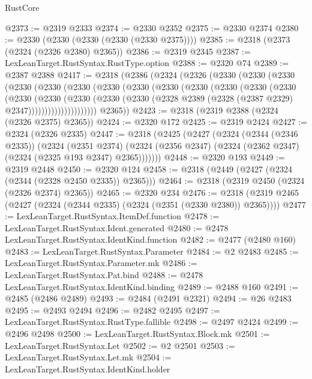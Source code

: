 \begin{lexlean}{RustCore}
\begin{coremodule}
@2373 := @2319 @2333
@2374 := @2330 @2352
@2375 := @2330 @2374
@2380 := @2330 (@2330 (@2330 (@2330 (@2330 @2375))))
@2385 := @2318 (@2373 (@2324 (@2326 @2380) @2365))
@2386 := @2319 @2345
@2387 := LexLeanTarget.RustSyntax.RustType.option
@2388 := @2320 @74
@2389 := @2387 @2388
@2417 := @2318
    (@2386
      (@2324
        (@2326
          (@2330
            (@2330
              (@2330
                (@2330
                  (@2330
                    (@2330
                      (@2330
                        (@2330
                          (@2330
                            (@2330
                              (@2330
                                (@2330
                                  (@2330
                                    (@2330
                                      (@2330
                                        (@2330
                                          (@2330
                                            (@2330
                                              (@2328
                                                @2389
                                                (@2328 (@2387 @2329) @2347)))))))))))))))))))))
        @2365))
@2423 := @2318 (@2319 @2388 (@2324 (@2326 @2375) @2365))
@2424 := @2320 @172
@2425 := @2319 @2424
@2427 := @2324 (@2326 @2335)
@2447 := @2318
    (@2425
      (@2427
        (@2324
          (@2344 (@2346 @2335))
          (@2324
            (@2351 @2374)
            (@2324 (@2356 @2347) (@2324 (@2362 @2347) (@2324 (@2325 @193 @2347) @2365)))))))
@2448 := @2320 @193
@2449 := @2319 @2448
@2450 := @2320 @124
@2458 := @2318 (@2449 (@2427 (@2324 (@2344 (@2328 @2450 @2335)) @2365)))
@2464 := @2318 (@2319 @2450 (@2324 (@2326 @2374) @2365))
@2465 := @2320 @234
@2476 := @2318 (@2319 @2465 (@2427 (@2324 (@2344 @2335) (@2324 (@2351 (@2330 @2380)) @2365))))
@2477 := LexLeanTarget.RustSyntax.ItemDef.function
@2478 := LexLeanTarget.RustSyntax.Ident.generated
@2480 := @2478 LexLeanTarget.RustSyntax.IdentKind.function
@2482 := @2477 (@2480 @160)
@2483 := LexLeanTarget.RustSyntax.Parameter
@2484 := @2 @2483
@2485 := LexLeanTarget.RustSyntax.Parameter.mk
@2486 := LexLeanTarget.RustSyntax.Pat.bind
@2488 := @2478 LexLeanTarget.RustSyntax.IdentKind.binding
@2489 := @2488 @160
@2491 := @2485 (@2486 @2489)
@2493 := @2484 (@2491 @2321)
@2494 := @26 @2483
@2495 := @2493 @2494
@2496 := @2482 @2495
@2497 := LexLeanTarget.RustSyntax.RustType.fallible
@2498 := @2497 @2424
@2499 := @2496 @2498
@2500 := LexLeanTarget.RustSyntax.Block.mk
@2501 := LexLeanTarget.RustSyntax.Let
@2502 := @2 @2501
@2503 := LexLeanTarget.RustSyntax.Let.mk
@2504 := LexLeanTarget.RustSyntax.IdentKind.holder

\end{coremodule}
\end{lexlean}
